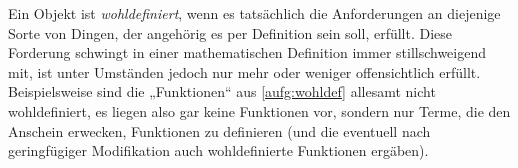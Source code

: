 \begin{description}[labelindent=0pt, leftmargin=0pt]
    \item[Wohldefiniert:]  Ein Objekt ist \emph{wohldefiniert}, wenn es tatsächlich die Anforderungen an diejenige Sorte von Dingen, der angehörig es per Definition sein soll, erfüllt. Diese Forderung schwingt in einer mathematischen Definition immer stillschweigend mit, ist unter Umständen jedoch nur mehr oder weniger offensichtlich erfüllt. Beispielsweise sind die „Funktionen“ aus \cref{aufg:wohldef} allesamt nicht wohldefiniert, es liegen also gar keine Funktionen vor, sondern nur Terme, die den Anschein erwecken, Funktionen zu definieren (und die eventuell nach geringfügiger Modifikation auch wohldefinierte Funktionen ergäben).
    
\end{description}

